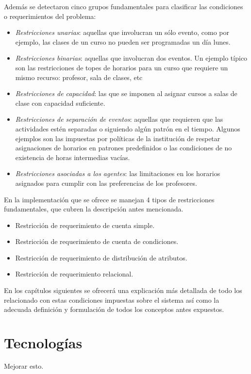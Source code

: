 Además se detectaron cinco grupos fundamentales para clasificar las condiciones o requerimientos del problema:
\begin{itemize}
	\item \textit{Restricciones unarias}: aquellas que involucran un sólo evento, como por ejemplo, las clases de un curso no pueden ser programadas un día lunes.
	\item \textit{Restricciones binarias}: aquellas que involucran dos eventos. Un ejemplo típico son las restricciones de topes de horarios para un curso que requiere un mismo recurso: profesor, sala de clases, etc
	\item \textit {Restricciones de capacidad}: las que se imponen al asignar cursos a salas de clase con capacidad suficiente.
	\item \textit{Restricciones de separación de eventos}:  aquellas que requieren que las actividades estén separadas o siguiendo algún patrón en el tiempo. Algunos ejemplos son las impuestas por políticas de la institución de respetar asignaciones de horarios en patrones predefinidos o las condiciones de no existencia de horas intermedias vacías.
	\item \textit{Restricciones asociadas a los  agentes}: las limitaciones en los horarios asignados para cumplir con las preferencias de los profesores.
\end{itemize}

En la implementación que se ofrece se manejan 4 tipos de restricciones fundamentales, que cubren la descripción antes mencionada.
\begin{itemize}
	\item Restricción de requerimiento de cuenta simple.
	\item Restricción de requerimiento de cuenta de condiciones.
	\item Restricción de requerimiento de distribución de atributos.
	\item Restricción de requerimiento relacional.
\end{itemize}
En los capítulos siguientes se ofrecerá una explicación más detallada de todo los relacionado con estas condiciones impuestas sobre el sistema así como la adecuada definición y formulación de todos los conceptos antes expuestos.

\section{Tecnologías}

Mejorar esto. \\\\

